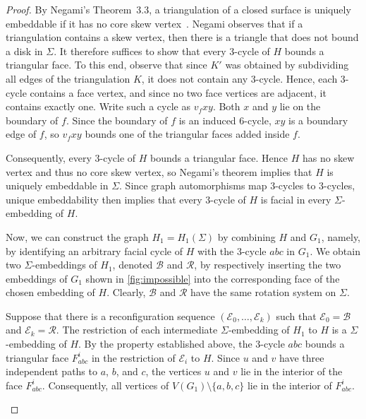 \documentclass[a4paper,USenglish,cleveref,colorlinks=true,urlcolor=black,linkcolor=black,citecolor=black,thm-restate,authorcolumns]{lipics-v2021}
\theoremstyle{claimstyle}
\begin{document}
\begin{proof}
    By Negami's Theorem~3.3, a triangulation of a closed surface is uniquely embeddable
    if it has no core skew vertex~\cite[Theorem~3.3, pp.~75--76]{Negami1985}.
    Negami observes that if a triangulation contains a skew vertex,
    then there is a triangle that does not bound a disk in $\Sigma$.
    It therefore suffices to show that every $3$-cycle of $H$ bounds a triangular face.
    To this end, observe that since $K'$ was obtained by subdividing all edges of the triangulation $K$, it does not contain any $3$-cycle.
    Hence, each $3$-cycle contains a face vertex, and since no two face vertices are adjacent, it contains exactly one.
    Write such a cycle as $v_f xy$.
    Both $x$ and $y$ lie on the boundary of $f$.
    Since the boundary of $f$ is an induced $6$-cycle, $xy$ is a boundary edge of $f$, so $v_f xy$ bounds one of the triangular faces added inside $f$.

    Consequently, every $3$-cycle of $H$ bounds a triangular face.
    Hence $H$ has no skew vertex and thus no core skew vertex, so Negami's theorem implies that $H$ is uniquely embeddable in $\Sigma$.
    Since graph automorphisms map $3$-cycles to $3$-cycles, unique embeddability then implies that every $3$-cycle of $H$ is facial in every $\Sigma$-embedding of $H$.

    \begin{claimproof} 
        Now, we can construct the graph $H_1=H_1(\Sigma)$ by combining $H$ and $G_1$, namely, by identifying an arbitrary facial cycle of $H$ with the 3-cycle $abc$ in $G_1$.
        We obtain two $\Sigma$-embeddings of $H_1$, denoted $\mathcal{B}$ and $\mathcal{R}$, by respectively inserting the two embeddings of $G_1$ shown in \cref{fig:impossible} into the corresponding face of the chosen embedding of $H$.
        Clearly, $\mathcal{B}$ and $\mathcal{R}$ have the same rotation system on $\Sigma$.

        Suppose that there is a reconfiguration sequence $(\mathcal{E}_0,\ldots ,\mathcal{E}_k)$ such that $\mathcal{E}_0=\mathcal{B}$ and $\mathcal{E}_k=\mathcal{R}$.
        The restriction of each intermediate $\Sigma$-embedding of $H_1$ to $H$ is a $\Sigma$-embedding of $H$.
        By the property established above, the $3$-cycle $abc$ bounds a triangular face $F^i_{abc}$ in the restriction of $\mathcal E_i$ to $H$.
        Since $u$ and $v$ have three independent paths to $a$, $b$, and $c$, the vertices $u$ and $v$ lie in the interior of the face $F^i_{abc}$.
        Consequently, all vertices of $V(G_1)\setminus \{a,b,c\}$ lie in the interior of $F^i_{abc}$.


\end{claimproof}
\end{proof}
\end{document}
